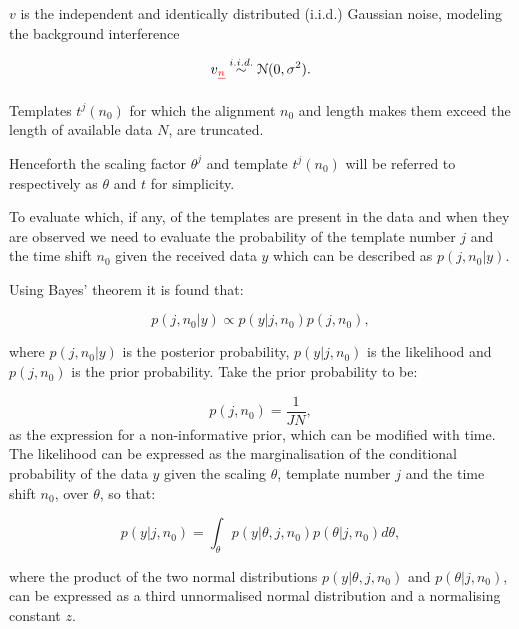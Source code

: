 \DIFdelbegin {}\DIFdelend \DIFaddbegin {}\DIFaddend $v$ is the independent and identically distributed (i.i.d.) Gaussian noise, modeling the background interference\DIFdelbegin {}\DIFdelend \DIFaddbegin \DIFadd{:
}\DIFaddend

\begin{equation}\label{eq:MLnoise}
v \DIFdelbegin \DIFdel{_n }\DIFdelend \stackrel{i.i.d.}{\sim} \mathcal{N}(0,\sigma^2).
\end{equation}

Templates $t^j(n_0)$ for which the alignment $n_0$ and length makes them exceed the length of available data $N$, are truncated.

Henceforth the scaling factor $\theta^j$ and template $t^j(n_0)$ will be referred to respectively as $\theta$ and $t$ for simplicity.

To evaluate which, if any, of the templates are present in the data and when they are observed we need to evaluate the probability of the template number $j$ and the time shift $n_0$ given the received data $y$ which can be described as $p(j,n_0|y)$.

Using Bayes' theorem it is found that:

\begin{equation}\label{eq:MLBayes}
p(j,n_0|y) \propto p(y|j,n_0)p(j,n_0),
\end{equation}

where $p(j,n_0|y)$ is the posterior probability, $p(y|j,n_0)$ is the likelihood and $p(j,n_0)$ is the prior probability.
Take the prior probability to be:

\begin{equation}\label{eq:MLPrior}
p(j,n_0) = \frac{1}{JN},
\end{equation}
as the expression for a non-informative prior, which can be modified with time.
The likelihood can be expressed as the marginalisation of the conditional probability of the data $y$ given the scaling $\theta$, template number $j$ and the time shift $n_0$, over $\theta$, so that:

\begin{equation}\label{eq:MLmargin}
p(y|j,n_0)=\int_\theta p(y|\theta, j, n_0) p(\theta|j,n_0) d\theta,
\end{equation}

where the product of the two normal distributions $p(y|\theta, j, n_0)$ and $p(\theta|j,n_0)$, can be expressed as a third unnormalised normal distribution and a normalising constant $z$.

